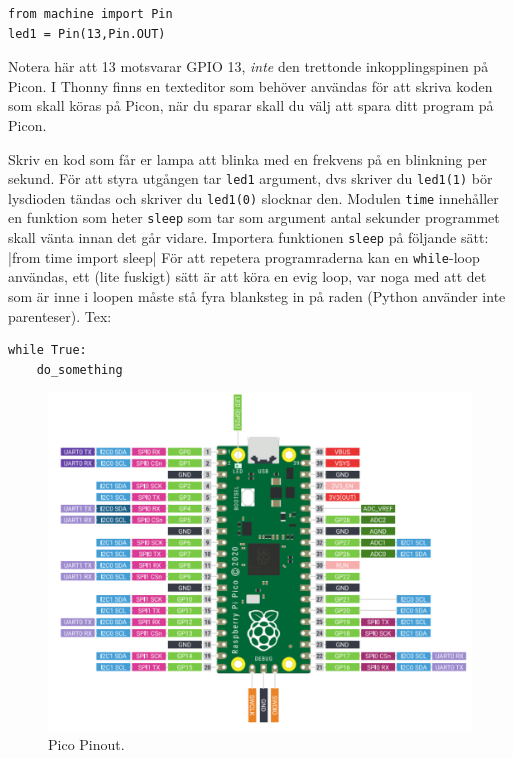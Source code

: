 \documentclass{article}
\begin{document}
\begin{verbatim}
from machine import Pin
led1 = Pin(13,Pin.OUT)   
\end{verbatim}
Notera här att 13 motsvarar GPIO 13, \emph{inte} den trettonde inkopplingspinen på Picon. I Thonny finns en texteditor som behöver användas för att skriva koden som skall köras på Picon, när du sparar skall du välj att spara ditt program på Picon.

Skriv en kod som får er lampa att blinka med en frekvens på en blinkning per sekund.
För att styra utgången tar \texttt{led1} argument, dvs skriver du \texttt{led1(1)} bör lysdioden tändas och skriver du \texttt{led1(0)} slocknar den. Modulen \texttt{time} innehåller en funktion som heter \texttt{sleep} som tar som argument antal sekunder programmet skall vänta innan det går vidare. Importera funktionen \texttt{sleep} på följande sätt:
|from time import sleep|
För att repetera programraderna kan en \texttt{while}-loop användas, ett (lite fuskigt) sätt är att köra en evig loop, var noga med att det som är inne i loopen måste stå fyra blanksteg in på raden (Python använder inte parenteser). Tex:
\begin{verbatim}
while True:
    do_something
\end{verbatim}
\begin{figure}[h]
    \centering
    \includegraphics[scale=0.5]{picopinout.png}
    \caption{Pico Pinout.}
    \label{fig:pico}
\end{figure}
\end{document}
